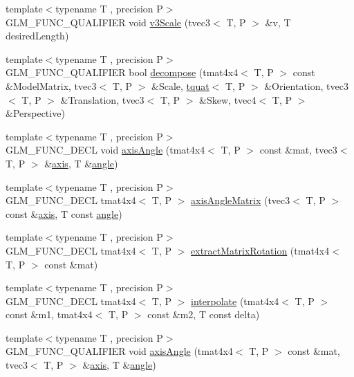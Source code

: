 \begin{DoxyCompactItemize}
{\footnotesize template$<$typename T , precision P$>$ }\\G\+L\+M\+\_\+\+F\+U\+N\+C\+\_\+\+Q\+U\+A\+L\+I\+F\+I\+E\+R void \hyperlink{namespaceglm_a41913e53ca770060771eb531af3532a9}{v3\+Scale} (tvec3$<$ T, P $>$ \&v, T desired\+Length)
\item 
{\footnotesize template$<$typename T , precision P$>$ }\\G\+L\+M\+\_\+\+F\+U\+N\+C\+\_\+\+Q\+U\+A\+L\+I\+F\+I\+E\+R bool \hyperlink{group__gtx__matrix__decompose_ga0f1245817507156b337798a253577c8b}{decompose} (tmat4x4$<$ T, P $>$ const \&Model\+Matrix, tvec3$<$ T, P $>$ \&Scale, \hyperlink{structglm_1_1tquat}{tquat}$<$ T, P $>$ \&Orientation, tvec3$<$ T, P $>$ \&Translation, tvec3$<$ T, P $>$ \&Skew, tvec4$<$ T, P $>$ \&Perspective)
\item 
{\footnotesize template$<$typename T , precision P$>$ }\\G\+L\+M\+\_\+\+F\+U\+N\+C\+\_\+\+D\+E\+C\+L void \hyperlink{group__gtx__matrix__interpolation_ga9aef292eb5f29bdbb58a53ef4281af92}{axis\+Angle} (tmat4x4$<$ T, P $>$ const \&mat, tvec3$<$ T, P $>$ \&\hyperlink{group__gtc__quaternion_ga0b3e87a13b2708154b72259e50789a19}{axis}, T \&\hyperlink{group__gtc__quaternion_gad4a4448baedb198b2b1e7880d2544dc9}{angle})
\item 
{\footnotesize template$<$typename T , precision P$>$ }\\G\+L\+M\+\_\+\+F\+U\+N\+C\+\_\+\+D\+E\+C\+L tmat4x4$<$ T, P $>$ \hyperlink{group__gtx__matrix__interpolation_ga82d4bc058e9628cb2ea1d4e117a0cf39}{axis\+Angle\+Matrix} (tvec3$<$ T, P $>$ const \&\hyperlink{group__gtc__quaternion_ga0b3e87a13b2708154b72259e50789a19}{axis}, T const \hyperlink{group__gtc__quaternion_gad4a4448baedb198b2b1e7880d2544dc9}{angle})
\item 
{\footnotesize template$<$typename T , precision P$>$ }\\G\+L\+M\+\_\+\+F\+U\+N\+C\+\_\+\+D\+E\+C\+L tmat4x4$<$ T, P $>$ \hyperlink{group__gtx__matrix__interpolation_ga6b8170aa4cf43caf81400696ebb38afe}{extract\+Matrix\+Rotation} (tmat4x4$<$ T, P $>$ const \&mat)
\item 
{\footnotesize template$<$typename T , precision P$>$ }\\G\+L\+M\+\_\+\+F\+U\+N\+C\+\_\+\+D\+E\+C\+L tmat4x4$<$ T, P $>$ \hyperlink{group__gtx__matrix__interpolation_ga45099a92c5c704503565619ac2bcd5c6}{interpolate} (tmat4x4$<$ T, P $>$ const \&m1, tmat4x4$<$ T, P $>$ const \&m2, T const delta)
\item 
{\footnotesize template$<$typename T , precision P$>$ }\\G\+L\+M\+\_\+\+F\+U\+N\+C\+\_\+\+Q\+U\+A\+L\+I\+F\+I\+E\+R void \hyperlink{group__gtx__matrix__interpolation_ga9aef292eb5f29bdbb58a53ef4281af92}{axis\+Angle} (tmat4x4$<$ T, P $>$ const \&mat, tvec3$<$ T, P $>$ \&\hyperlink{group__gtc__quaternion_ga0b3e87a13b2708154b72259e50789a19}{axis}, T \&\hyperlink{group__gtc__quaternion_gad4a4448baedb198b2b1e7880d2544dc9}{angle})

\end{DoxyCompactItemize}
